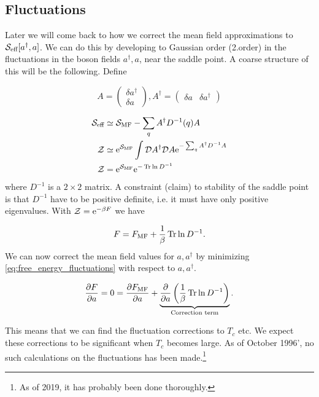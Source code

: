 \subsection{Fluctuations}
Later we will come back to how we correct the mean field approximations to \(\mathcal{S}_{\text{eff}}[a^\dagger, a]\). We can do this by developing to Gaussian order  (2.order) in the fluctuations in the boson fields \(a^\dagger, a\), near the saddle point. A coarse structure of this will be the following. Define 

\begin{equation}
A = 
\begin{pmatrix}
\delta a^\dagger \\
\delta a
\end{pmatrix}, 
A^\dagger =
\begin{pmatrix}
\delta a & \delta a^\dagger
\end{pmatrix}
\end{equation}

\begin{align}
\mathcal{S}_{\text{eff}} &\simeq \mathcal{S}_{\text{MF}} - \sum_q A^\dagger D^{-1}(q)A \nonumber\\
\mathcal{Z} &\simeq \mathrm{e}^{\mathcal{S}_{\text{MF}}}\int\mathcal{D} A^\dagger\mathcal{D} A\mathrm{e}^{- \sum_q A^\dagger D^{-1}A}\nonumber  \\
\mathcal{Z} &= \mathrm{e}^{\mathcal{S}_{\text{MF}}}\mathrm{e}^{-\Tr\ln D^{-1}} \label{eq:partition_fluctuations}
\end{align} where $D^{-1}$ is a \(2\times 2\) matrix. A constraint (claim) to stability of the saddle point is that $D^{-1}$ have to be positive definite, i.e. it must have only positive eigenvalues. 
With $\mathcal{Z} = \mathrm{e}^{-\beta F}$  we have 

\begin{equation}
\label{eq:free_energy_fluctuations}
F = F_{\text{MF}} + \frac{1}{\beta}\Tr\ln D^{-1}.
\end{equation}
We can now correct  the mean field values for $a, a^\dagger$ by minimizing \eqref{eq:free_energy_fluctuations} with respect to $a, a^\dagger$.

\begin{equation}
\pdv{F}{a} =0 = \pdv{F_{\text{MF}}}{a} + \underbrace{\pdv{a}\left(\frac{1}{\beta}\Tr\ln D^{-1}\right)}_{\text{Correction term}}.
\end{equation}

This means that we can find the fluctuation corrections to $T_c$ etc. We expect these corrections to be significant when $T_c$ becomes large. As of October 1996', no such calculations on the fluctuations has been made.\footnote{As of 2019, it has probably been done thoroughly.}
